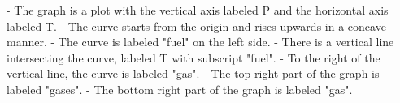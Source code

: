 - The graph is a plot with the vertical axis labeled P and the horizontal axis labeled T.
- The curve starts from the origin and rises upwards in a concave manner.
- The curve is labeled "fuel" on the left side.
- There is a vertical line intersecting the curve, labeled T with subscript "fuel".
- To the right of the vertical line, the curve is labeled "gas".
- The top right part of the graph is labeled "gases".
- The bottom right part of the graph is labeled "gas".